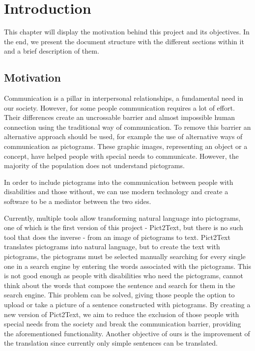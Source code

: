 
\chapter{Introduction}
\label{cap:introduction}

This chapter will display the motivation behind this project and its objectives. In the end, we present the document structure with the different sections within it and a brief description of them.

\section{Motivation}
Communication is a pillar in interpersonal relationships, a fundamental need in our society. However, for some people communication requires a lot of effort. Their differences create an uncrossable barrier and almost impossible human connection using the traditional way of communication. To remove this barrier an alternative approach should be used, for example the use of alternative ways of communication as pictograms. These graphic images, representing an object or a concept, have helped people with special needs to communicate. However, the majority of the population does not understand pictograms.

In order to include pictograms into the communication between people with disabilities and those without, we can use modern technology and create a software to be a mediator between the two sides. 

Currently, multiple tools allow transforming natural language into pictograms, one of which is the first version of this project -  Pict2Text, but there is no such tool that does the inverse - from an image of pictograms to text. Pict2Text translates pictograms into natural language, but to create the text with pictograms, the pictograms must be selected manually searching for every single one in a search engine by entering the words associated with the pictograms. This is not good enough as people with disabilities who need the pictograms, cannot think about the words that compose the sentence and search for them in the search engine. This problem can be solved, giving those people the option to upload or take a picture of a sentence constructed with pictograms. By creating a new version of Pict2Text, we aim to reduce the exclusion of those people with special needs from the society and break the communication barrier, providing the aforementioned functionality. Another objective of ours is the improvement of the translation since currently only simple sentences can be translated.


